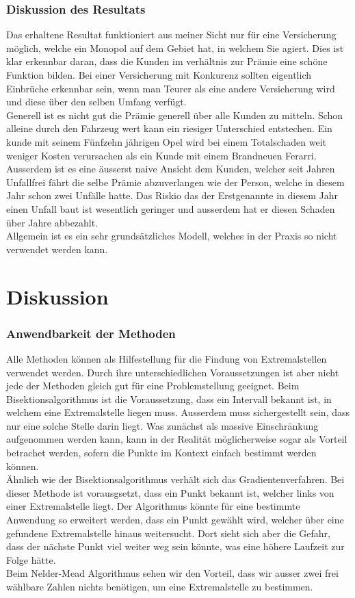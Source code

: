 \documentclass[10pt]{article}         %
\begin{document}
\subsubsection{Diskussion des Resultats} %
\label{ssub:diskussion_des_resultats}
Das erhaltene Resultat funktioniert aus meiner Sicht nur für eine Versicherung möglich, welche ein Monopol auf dem Gebiet hat, in welchem Sie agiert. Dies ist klar erkennbar daran, dass die Kunden im verhältnis zur Prämie eine schöne Funktion bilden. Bei einer Versicherung mit Konkurenz sollten eigentlich Einbrüche erkennbar sein, wenn man Teurer als eine andere Versicherung wird und diese über den selben Umfang verfügt. \\
Generell ist es nicht gut die Prämie generell über alle Kunden zu mitteln. Schon alleine durch den Fahrzeug wert kann ein riesiger Unterschied entstechen. Ein kunde mit seinem Fünfzehn jährigen Opel wird bei einem Totalschaden weit weniger Kosten verursachen als ein Kunde mit einem Brandneuen Ferarri.
Ausserdem ist es eine äusserst naive Ansicht dem Kunden, welcher seit Jahren Unfallfrei fährt die selbe Prämie abzuverlangen wie der Person, welche in diesem Jahr schon zwei Unfälle hatte. Das Riskio das der Erstgenannte in diesem Jahr einen Unfall baut ist wesentlich geringer und ausserdem hat er diesen Schaden über Jahre abbezahlt.\\
Allgemein ist es ein sehr grundsätzliches Modell, welches in der Praxis so nicht verwendet werden kann.
\section{Diskussion}
\subsubsection{Anwendbarkeit der Methoden}
Alle Methoden können als Hilfestellung für die Findung von Extremalstellen verwendet werden. Durch ihre unterschiedlichen Voraussetzungen ist aber nicht jede der Methoden gleich gut für eine Problemstellung geeignet. Beim Bisektionsalgorithmus ist die Voraussetzung, dass ein Intervall bekannt ist, in welchem eine Extremalstelle liegen muss. Ausserdem muss sichergestellt sein, dass nur eine solche Stelle darin liegt. Was zunächst als massive Einschränkung aufgenommen werden kann, kann in der Realität möglicherweise sogar als Vorteil betrachet werden, sofern die Punkte im Kontext einfach bestimmt werden können.\\
Ähnlich wie der Bisektionsalgorithmus verhält sich das Gradientenverfahren. Bei dieser Methode ist vorausgsetzt, dass ein Punkt bekannt ist, welcher links von einer Extremalstelle liegt. Der Algorithmus könnte für eine bestimmte Anwendung so erweitert werden, dass ein Punkt gewählt wird, welcher über eine gefundene Extremalstelle hinaus weitersucht. Dort sieht sich aber die Gefahr, dass der nächste Punkt viel weiter weg sein könnte, was eine höhere Laufzeit zur Folge hätte.\\
Beim Nelder-Mead Algorithmus sehen wir den Vorteil, dass wir ausser zwei frei wählbare Zahlen nichts benötigen, um eine Extremalstelle zu bestimmen.
\end{document}
